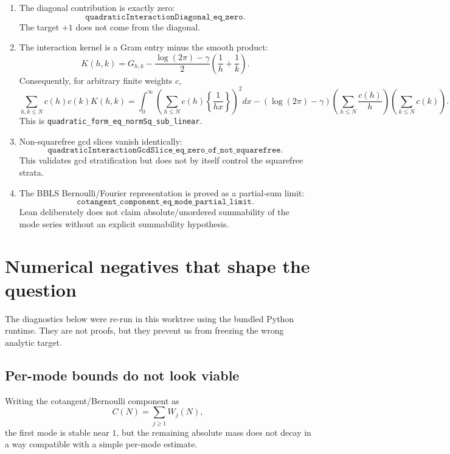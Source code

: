 \documentclass[11pt]{article}
\newcommand{\fract}[1]{\left\{#1\right\}}
\begin{document}
\begin{enumerate}[label=\textbf{R\arabic*.},leftmargin=2.2em]
  \item The diagonal contribution is exactly zero:
  \[
    \texttt{quadraticInteractionDiagonal\_eq\_zero}.
  \]
  The target $+1$ does not come from the diagonal.

  \item The interaction kernel is a Gram entry minus the smooth product:
  \[
    K(h,k)
    =
    G_{h,k}
    -
    \frac{\log(2\pi)-\gamma}{2}
    \left(\frac1h+\frac1k\right).
    \tag{4}
  \]
  Consequently, for arbitrary finite weights $c$,
  \[
  \sum_{h,k\le N}c(h)c(k)K(h,k)
  =
  \int_0^\infty
  \left(
    \sum_{h\le N}c(h)\fract{\frac1{hx}}
  \right)^2dx
  -
  (\log(2\pi)-\gamma)
  \left(\sum_{h\le N}\frac{c(h)}h\right)
  \left(\sum_{k\le N}c(k)\right).
  \tag{5}
  \]
  This is
  \texttt{quadratic\_form\_eq\_normSq\_sub\_linear}.

  \item Non-squarefree gcd slices vanish identically:
  \[
    \texttt{quadraticInteractionGcdSlice\_eq\_zero\_of\_not\_squarefree}.
  \]
  This validates gcd stratification but does not by itself control the
  squarefree strata.

  \item The BBLS Bernoulli/Fourier representation is proved as a partial-sum
  limit:
  \[
    \texttt{cotangent\_component\_eq\_mode\_partial\_limit}.
  \]
  Lean deliberately does not claim absolute/unordered summability of the mode
  series without an explicit summability hypothesis.
\end{enumerate}

\section{Numerical negatives that shape the question}

The diagnostics below were re-run in this worktree using the bundled Python
runtime.  They are not proofs, but they prevent us from freezing the wrong
analytic target.

\subsection{Per-mode bounds do not look viable}

Writing the cotangent/Bernoulli component as
\[
  C(N)=\sum_{j\ge1}W_j(N),
\]
the first mode is stable near $1$, but the remaining absolute mass does not
decay in a way compatible with a simple per-mode estimate.
\end{document}
